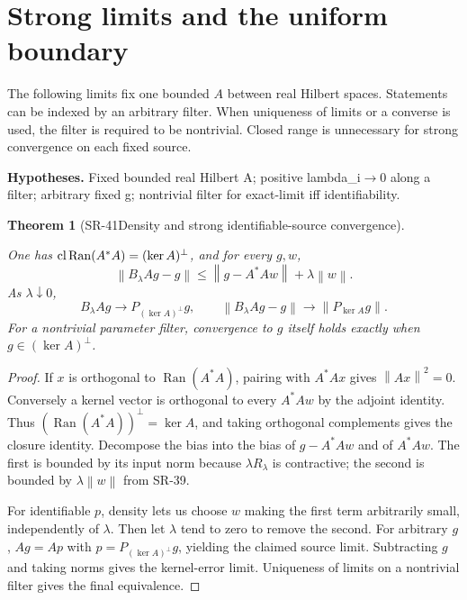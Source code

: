 \documentclass[11pt]{article}
\newtheorem{theorem}{Theorem}[section]
\theoremstyle{definition}\newtheorem{definition}[theorem]{Definition}
\theoremstyle{remark}\newtheorem{remark}[theorem]{Remark}
\DeclareMathOperator{\Ran}{Ran}\DeclareMathOperator{\dist}{dist}
\newcommand{\nn}[1]{\left\lVert #1\right\rVert}
\begin{document}
\section{Strong limits and the uniform boundary}

The following limits fix one bounded $A$ between real Hilbert spaces.
Statements can be indexed by an arbitrary filter. When uniqueness of
limits or a converse is used, the filter is required to be nontrivial.
Closed range is unnecessary for strong convergence on each fixed source.


\par{\small\textbf{Hypotheses.} Fixed bounded real Hilbert A; positive lambda\_i\(\to\)0 along a filter; arbitrary fixed g; nontrivial filter for exact-limit iff identifiability.}\par

\begin{theorem}[SR-41\quad Density and strong identifiable-source convergence]\label{SR-41}

One has $\cl\Ran(A^*A)=(\ker A)^\perp$, and for every $g,w$,
\[
\nn{B_\lambda Ag-g}\le\nn{g-A^*Aw}+\lambda\nn w.
\]
As $\lambda\downarrow0$,
\[
B_\lambda Ag\longrightarrow P_{(\ker A)^\perp}g,
\qquad \nn{B_\lambda Ag-g}\longrightarrow\nn{P_{\ker A}g}.
\]
For a nontrivial parameter filter, convergence to $g$ itself holds exactly
when $g\in(\ker A)^\perp$.

\end{theorem}
\begin{proof}

If $x$ is orthogonal to $\Ran(A^*A)$, pairing with $A^*Ax$ gives
$\nn{Ax}^2=0$. Conversely a kernel vector is orthogonal to every
$A^*Aw$ by the adjoint identity. Thus
$(\Ran(A^*A))^\perp=\ker A$, and taking orthogonal complements gives
the closure identity. Decompose the bias into the bias of
$g-A^*Aw$ and of $A^*Aw$. The first is bounded by its input norm because
$\lambda R_\lambda$ is contractive; the second is bounded by
$\lambda\nn w$ from SR-39.

For identifiable $p$, density lets us choose $w$ making the first term
arbitrarily small, independently of $\lambda$. Then let $\lambda$ tend
to zero to remove the second. For arbitrary $g$, $Ag=Ap$ with
$p=P_{(\ker A)^\perp}g$, yielding the claimed source limit.
Subtracting $g$ and taking norms gives the kernel-error limit.
Uniqueness of limits on a nontrivial filter gives the final equivalence.

\end{proof}
\end{document}
